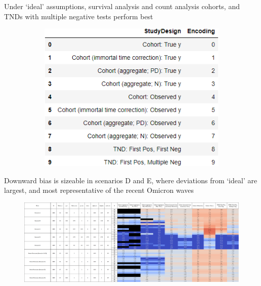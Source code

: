 \documentclass[aspectratio=169]{beamer}
\begin{document}
\begin{frame}{Under `ideal' assumptions, survival analysis and count analysis cohorts, and TNDs with multiple negative tests perform best}
\begin{figure}[H]
\begin{subfigure}[c]{0.31\linewidth}
			\includegraphics[scale=0.28]{VEmethod_RelDirection1b_DictDesign.png}
		\end{subfigure}
	\end{figure}
\end{frame}

\begin{frame}{Downward bias is sizeable in scenarios D and E, where deviations from `ideal' are largest, and most representative of the recent Omicron waves}
	\begin{figure}[H]
		\centering
		\includegraphics[scale=0.22]{VEMethod_Sim1b_WaveSpecific_Heatmap.png}
	\end{figure}
\end{frame}
\end{document}
